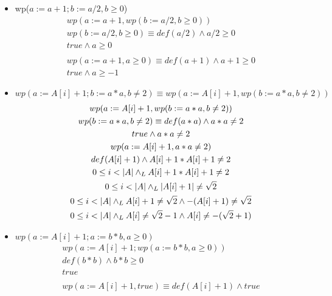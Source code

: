 \documentclass[10pt,a4paper]{article}
\begin{document}
\begin{itemize}
    \item wp($a:=a+1; b:=a/2, b\geq 0$)
    \begin{equation*}
        \begin{gathered}
            wp(a:=a+1, wp(b:= a/2, b\geq 0))\\
            wp(b:= a/2, b\geq 0)\equiv def(a/2)\land a/2\geq 0\\
            true\land a\geq 0\\
\\
            wp(a:=a+1, a\geq 0)\equiv def(a+1) \land a+1\geq0\\
            true\land a\geq -1
        \end{gathered}
    \end{equation*}
    \item $wp(a:=A[i]+1; b:=a*a, b\not=2)\equiv wp(a:=A[i]+1,wp(b:=a*a,b\not=2))$
    \begin{equation*}
        \begin{gathered}
            wp(a:=A[i]+1,wp(b:=a*a,b\not=2))\\
            wp(b:=a*a,b\not=2)\equiv def(a*a)\land a*a\not=2\\
            true\land a*a\not=2
            \\
            wp(a:=A[i]+1, a*a\not=2)\\
            def(A[i]+1)\land A[i]+1*A[i]+1\not=2\\
            0\leq i < |A| \land _L A[i]+1*A[i]+1\not=2\\
            0\leq i < |A| \land _L |A[i]+1|\not=\sqrt{2}\\
            0\leq i < |A| \land _L A[i]+1\not=\sqrt{2}\land -(A[i]+1)\not=\sqrt{2}\\
            0\leq i < |A| \land _L A[i]\not=\sqrt{2}-1\land A[i]\not=-(\sqrt{2}+1)
        \end{gathered}
    \end{equation*}
    \item $wp(a:=A[i]+1;a:=b*b, a\geq 0)$
    \begin{equation*}
        \begin{gathered}
            wp(a:=A[i]+1;wp(a:=b*b,a\geq 0))\\
            def(b*b)\land b*b\geq 0\\
            true\\
            \\
            wp(a:=A[i]+1,true)\equiv def(A[i]+1)\land true\\

\end{gathered}
\end{equation*}
\end{itemize}
\end{document}

